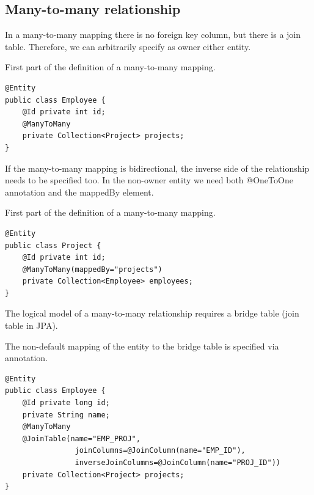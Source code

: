 \documentclass[12pt, a4paper]{report}
\begin{document}
    \subsection{Many-to-many relationship}
        In a many-to-many mapping there is no foreign key column, but there is a join table. Therefore, we can arbitrarily specify as owner either entity.
    \begin{example}
        First part of the definition of a many-to-many mapping. 
            \begin{lstlisting}[style=Java]
@Entity
public class Employee {
    @Id private int id;
    @ManyToMany
    private Collection<Project> projects;
}
            \end{lstlisting}
        \end{example}
        If the many-to-many mapping is bidirectional, the inverse side of the relationship needs to be specified too. In the non-owner entity we need both @OneToOne 
        annotation and the mappedBy element.
        \begin{example}
        First part of the definition of a many-to-many mapping. 
            \begin{lstlisting}[style=Java]
@Entity
public class Project {
    @Id private int id;
    @ManyToMany(mappedBy="projects")
    private Collection<Employee> employees;
}
            \end{lstlisting}
        \end{example}
        The logical model of a many-to-many relationship requires a bridge table (join table in JPA). 
        \begin{example}
            The non-default mapping of the entity to the bridge table is specified via annotation. 
            \begin{lstlisting}[style=Java]
@Entity
public class Employee {
    @Id private long id;
    private String name;
    @ManyToMany
    @JoinTable(name="EMP_PROJ",
                joinColumns=@JoinColumn(name="EMP_ID"),
                inverseJoinColumns=@JoinColumn(name="PROJ_ID"))
    private Collection<Project> projects;
}
            \end{lstlisting}
        \end{example}
    
\end{document}
